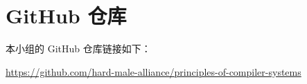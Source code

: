 \documentclass[a4paper,runningheads]{llncs}
\begin{document}



\clearpage
\appendix
\section{GitHub 仓库}
\label{app:github-repository}

本小组的 GitHub 仓库链接如下：
\begin{flushleft}
\url{https://github.com/hard-male-alliance/principles-of-compiler-systems}
\end{flushleft}
\end{document}
